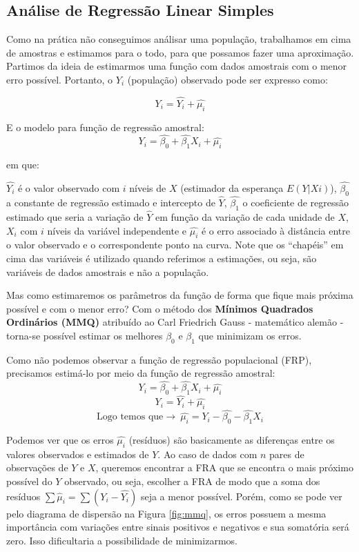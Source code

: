 \documentclass[
  openany]{book}
\begin{document}
\hypertarget{reglin}{%
\subsection{Análise de Regressão Linear Simples}\label{reglin}}

Como na prática não conseguimos análisar uma população, trabalhamos em cima de amostras e estimamos para o todo, para que possamos fazer uma aproximação. Partimos da ideia de estimarmos uma função com dados amostrais com o menor erro possível. Portanto, o \(Y_i\) (população) observado pode ser expresso como:

\begin{equation}
    Y_i=\hat{Y_i}+\hat{\mu_i}
    \label{eq:frp}
\end{equation}

E o modelo para função de regressão amostral:
\begin{equation}
    Y_i=\hat{\beta_0}+\hat{\beta_1}X_i+\hat{\mu_i}
    \label{eq:fra}
\end{equation}

em que:

\(\hat{Y_i}\) é o valor observado com \(i\) níveis de \(X\) (estimador da esperança \(E(Y|Xi)\)), \(\hat{\beta_0}\) a constante de regressão estimado e intercepto de \(\hat{Y}\), \(\hat{\beta_1}\) o coeficiente de regressão estimado que seria a variação de \(\hat{Y}\) em função da variação de cada unidade de \(X\), \(X_i\) com \(i\) níveis da variável independente e \(\hat{\mu_i}\) é o erro associado à distância entre o valor observado e o correspondente ponto na curva. Note que os ``chapéis'' em cima das variáveis é utilizado quando referimos a estimações, ou seja, são variáveis de dados amostrais e não a população.

Mas como estimaremos os parâmetros da função de forma que fique mais próxima possível e com o menor erro? Com o método dos \textbf{Mínimos Quadrados Ordinários (MMQ)} atribuído ao Carl Friedrich Gauss - matemático alemão - torna-se possível estimar os melhores \(\beta_0\) e \(\beta_1\) que minimizam os erros.

Como não podemos observar a função de regressão populacional (FRP), precisamos estimá-lo por meio da função de regressão amostral:
\[Y_i=\hat{\beta_0}+\hat{\beta_1}X_i+\hat{\mu_i} \]
\[Y_i=\hat{Y_i}+\hat{\mu_i}\]
\[\mbox{Logo temos que} \rightarrow \ \hat{\mu_i}=Y_i-\hat{\beta_0}-\hat{\beta_1} X_i\]

Podemos ver que os erros \(\hat{\mu_i}\) (resíduos) são basicamente as diferenças entre os valores observados e estimados de \(Y\). Ao caso de dados com \(n\) pares de observações de \(Y\) e \(X\), queremos encontrar a FRA que se encontra o mais próximo possível do \(Y\) observado, ou seja, escolher a
FRA de modo que a soma dos resíduos \(\sum \hat{\mu}_i=\sum(Y_i-\hat{Y_i})\) seja a menor possível. Porém, como se pode ver pelo diagrama de dispersão na Figura \ref{fig:mmq}, os erros possuem a mesma importância com variações entre sinais positivos e negativos e sua somatória será zero. Isso dificultaria a possibilidade de minimizarmos.
\end{document}
